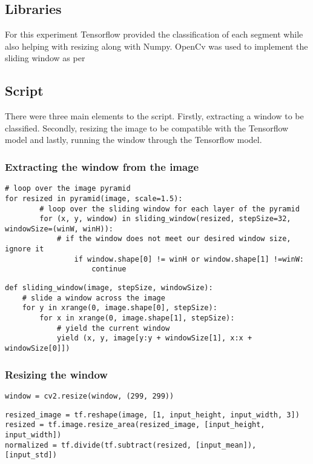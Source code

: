 \subsection*{Libraries}
For this experiment Tensorflow provided the classification of each segment while
also helping with resizing along with Numpy. OpenCv was used to implement the
sliding window as per \textcite{slidingWindowTut}

\subsection*{Script}
There were three main elements to the script. Firstly, extracting a window to be
classified. Secondly, resizing the image to be compatible with the Tensorflow
model and lastly, running the window through the Tensorflow model.

\subsubsection*{Extracting the window from the image}
\begin{lstlisting}
# loop over the image pyramid
for resized in pyramid(image, scale=1.5):
		# loop over the sliding window for each layer of the pyramid
		for (x, y, window) in sliding_window(resized, stepSize=32, windowSize=(winW, winH)):
			# if the window does not meet our desired window size, ignore it
				if window.shape[0] != winH or window.shape[1] !=winW:
					continue
\end{lstlisting}


\begin{lstlisting}
def sliding_window(image, stepSize, windowSize):
	# slide a window across the image
	for y in xrange(0, image.shape[0], stepSize):
		for x in xrange(0, image.shape[1], stepSize):
			# yield the current window
			yield (x, y, image[y:y + windowSize[1], x:x + windowSize[0]])
\end{lstlisting}

\subsubsection*{Resizing the window}
\begin{lstlisting}
window = cv2.resize(window, (299, 299))
\end{lstlisting}

\begin{lstlisting}
resized_image = tf.reshape(image, [1, input_height, input_width, 3])
resized = tf.image.resize_area(resized_image, [input_height, input_width])
normalized = tf.divide(tf.subtract(resized, [input_mean]), [input_std])
\end{lstlisting}

